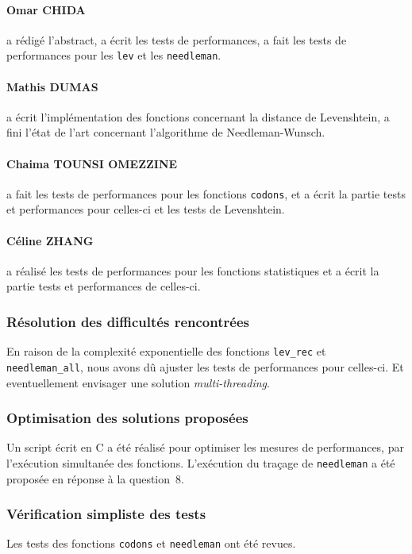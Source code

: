 \paragraph*{Omar CHIDA} a rédigé l'abstract, a écrit les tests de performances, a fait les tests de performances pour les \texttt{lev} et les \texttt{needleman}.

\paragraph*{Mathis DUMAS} a écrit l'implémentation des fonctions concernant la distance de Levenshtein, a fini l'état de l'art concernant l'algorithme de Needleman-Wunsch.

\paragraph*{Chaima TOUNSI OMEZZINE} a fait les tests de performances pour les fonctions \texttt{codons}, et a écrit la partie tests et performances pour celles-ci et les tests de Levenshtein.

\paragraph*{Céline ZHANG} a réalisé les tests de performances pour les fonctions statistiques et a écrit la partie tests et performances de celles-ci.

\subsubsection*{Résolution des difficultés rencontrées}
En raison de la complexité exponentielle des fonctions \texttt{lev\_rec} et \texttt{needleman\_all}, nous avons dû ajuster les tests de performances pour celles-ci. Et eventuellement envisager une solution \textsl{multi-threading}.

\subsubsection*{Optimisation des solutions proposées}
Un script écrit en \textsf{C} a été réalisé pour optimiser les mesures de performances, par l'exécution simultanée des fonctions. L'exécution du traçage de \texttt{needleman} a été proposée en réponse à la question~8.

\subsubsection*{Vérification simpliste des tests}
Les tests des fonctions \texttt{codons} et \texttt{needleman} ont été revues.

